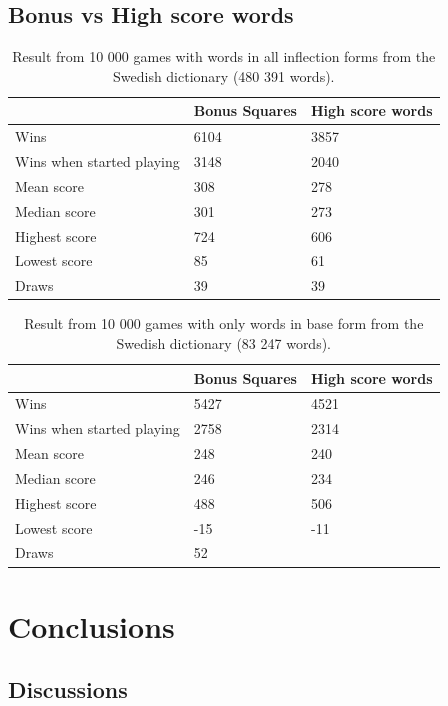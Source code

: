 \documentclass[a4paper, 12pt]{report}
\begin{document}
\section{Bonus vs High score words}
\label{sec:bonusHigh}

\begin{table}[h]
\centering
    \begin{tabular}{ l | l | l }
   	& Bonus Squares & High score words \\
   	\hline
   	Wins & 6104 & 3857 \\
	Wins when started playing & 3148 & 2040 \\   	
	Mean score & 308 & 278 \\
	Median score & 301 & 273 \\	 	 
	Highest score & 724 & 606 \\
	Lowest score & 85 & 61 \\		
	\hline 
   	Draws & 39 & 39 \\
    \end{tabular}
\caption{Result from 10 000 games with words in all inflection forms from the Swedish dictionary (480 391 words).}
\end{table}


\begin{table}[h]
\centering
    \begin{tabular}{ l | l | l }
   	& Bonus Squares & High score words \\
   	\hline
   	Wins & 5427 & 4521 \\
	Wins when started playing & 2758 & 2314 \\   	
	Mean score & 248 & 240 \\
	Median score & 246 & 234 \\	 	 
	Highest score & 488 & 506 \\
	Lowest score & -15 & -11 \\		
	\hline 
   	Draws & 52 &  \\
    \end{tabular}
\caption{Result from 10 000 games with only words in base form from the Swedish dictionary (83 247 words).}
\end{table}




\chapter{Conclusions}
\section{Discussions}
\end{document}
